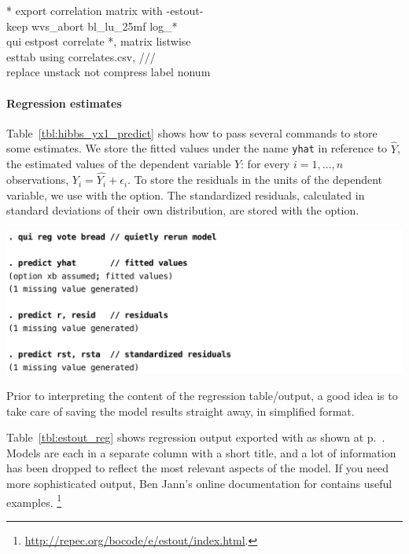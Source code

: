 \begin{docspec}
  * export correlation matrix with -estout-\\
  keep wvs\_abort bl\_lu\_25mf log\_*\\
  qui estpost correlate *, matrix listwise\\
  esttab using correlates.csv, ///\\%
    replace unstack not compress label nonum
\end{docspec}

%
%
%
\paragraph{Regression estimates}

Table~\ref{tbl:hibbs_yx1_predict} shows how to pass several  commands to store some estimates. We store the fitted values under the name \texttt{yhat} in reference to $\hat{Y}$, the estimated values of the dependent variable $Y$: for every $i=1, \ldots, n$ observations, $Y_i = \hat{Y_i} + \epsilon_i$. To store the residuals in the units of the dependent variable, we use  with the  option. The standardized residuals, calculated in standard deviations of their own distribution, are stored with the  option.

\begin{table}[htp]
	\includegraphics[scale=.5]{images/hibbs_yx1_predict.pdf}

	\caption[Storing estimates with ]{\label{tbl:hibbs_yx1_predict}%
	Storing estimates with . %
	\hibbs}
\end{table}%

Prior to interpreting the content of the regression table/output, a good idea is to take care of saving the model results straight away, in simplified format.

Table~\ref{tbl:estout_reg} shows regression output exported with  as shown at p.~\pageref{tbl:hibbs_yx1_estout}. Models are each in a separate column with a short title, and a lot of information has been dropped to reflect the most relevant aspects of the model. If you need more sophisticated output, Ben Jann's online documentation for  contains useful examples.%
\footnote{\url{http://repec.org/bocode/e/estout/index.html}.}

